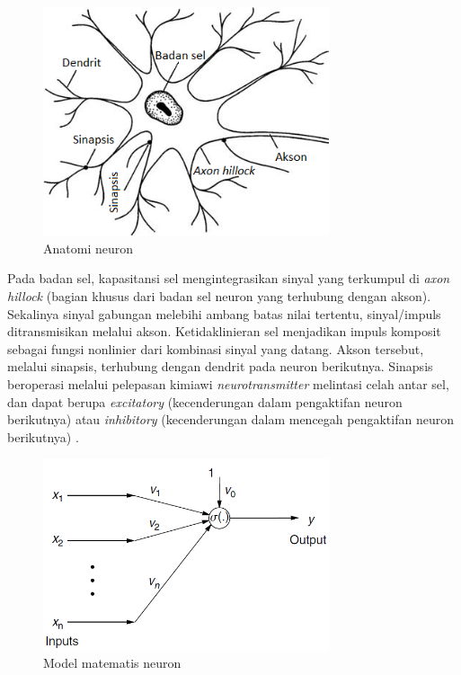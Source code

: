 \begin{figure}[!h]
	\centering
	\includegraphics[width=0.75\textwidth]{figures/neuron}
	\caption{Anatomi neuron \cite{NNControlBook}}
	\label{fig:3:neuron}
\end{figure}

Pada badan sel, kapasitansi sel mengintegrasikan sinyal yang terkumpul di \textit{axon hillock} (bagian khusus dari badan sel neuron yang terhubung dengan akson). Sekalinya sinyal gabungan melebihi ambang batas nilai tertentu, sinyal/impuls ditransmisikan melalui akson. Ketidaklinieran sel menjadikan impuls komposit sebagai fungsi nonlinier dari kombinasi sinyal yang datang. Akson tersebut, melalui sinapsis, terhubung dengan dendrit pada neuron berikutnya. Sinapsis beroperasi melalui pelepasan kimiawi \textit{neurotransmitter} melintasi celah antar sel, dan dapat berupa \textit{excitatory} (kecenderungan dalam pengaktifan neuron berikutnya) atau \textit{inhibitory} (kecenderungan dalam mencegah pengaktifan neuron berikutnya) \cite{NNControlBook}.

\begin{figure}[!h]
	\centering
	\includegraphics[width=0.75\textwidth]{figures/neuronmath}
	\caption{Model matematis neuron \cite{NNControlBook}}
	\label{fig:3:math}
\end{figure}

